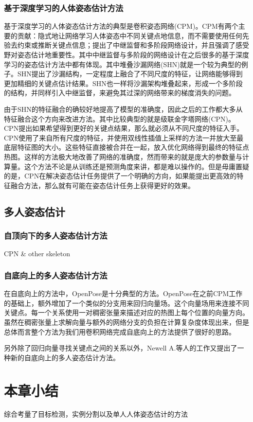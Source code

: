 \subsubsection{基于深度学习的人体姿态估计方法}
\label{subsubsec:deeppose}
基于深度学习的人体姿态估计方法的典型是卷积姿态网络(CPM)\cite{wei2016convolutional}。CPM有两个主要的贡献：隐式地让网络学习人体姿态中不同关键点地信息，而不需要使用任何先验去约束或推断关键点信息；提出了中继监督和多阶段网络设计，并且强调了感受野对姿态估计地重要性。其中中继监督与多阶段的网络设计在之后很多的基于深度学习的姿态估计方法中都有体现。其中堆叠沙漏网络(SHN)\cite{newell2016stacked}就是一个较为典型的例子。SHN提出了沙漏结构，一定程度上融合了不同尺度的特征，让网络能够得到更加精细的关键点估计结果。SHN也一样将沙漏架构堆叠起来，形成一个多阶段的结构，并同样引入中继监督，来避免其过深的网络带来的梯度消失的问题。

由于SHN的特征融合的确较好地提高了模型的准确度，因此之后的工作都大多从特征融合这个方向来改进方法。其中比较典型的就是级联金字塔网络(CPN)\cite{Chen2017Cascaded}。CPN提出如果希望得到更好的关键点结果，那么就必须从不同尺度的特征入手。CPN使用了来自所有尺度的特征，并使用双线性插值上采样的方法一并放大至最底层特征图的大小。这些特征直接被合并在一起，放入优化网络得到最终的特征点热图。这样的方法极大地改善了网络的准确度，然而带来的就是庞大的参数量与计算量。这个方法不论是从训练还是预测角度来讲，都是难以操作的。但是毋庸置疑的是，CPN在解决姿态估计任务提供了一个明确的方向，如果能提出更高效的特征融合方法，那么就有可能在姿态估计任务上获得更好的效果。

\subsection{多人姿态估计}
\label{subsubsec:multipose}
\subsubsection{自顶向下的多人姿态估计方法}
\label{subsubsec:topdownpose}
CPN \& other skeleton
\subsubsection{自底向上的多人姿态估计方法}
\label{subsubsec:bottomuppose}
在自底向上的方法中，OpenPose\cite{Cao2016Realtime}是十分典型的方法。OpenPose在之前CPM工作的基础上，额外增加了一个类似的分支用来回归向量场。这个向量场用来连接不同关键点。每一个关系使用一对稠密张量来描述对应的热图上每个位置的向量方向。虽然在稠密张量上求解向量与额外的网络分支的负担在计算复杂度体现出来，但是总体而言整个方法为我们用卷积网络完成自底向上的方法提供了很好的思路。

另外除了回归向量寻找关键点之间的关系以外，Newell A.\cite{Newell2017Associative}等人的工作又提出了一种新的自底向上的多人姿态估计方法。


\section{本章小结}
综合考量了目标检测，实例分割以及单人人体姿态估计的方法

